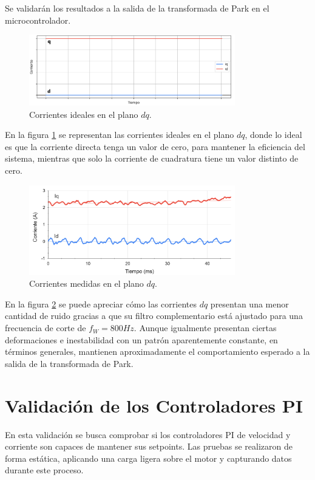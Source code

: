 \documentclass[11pt]{report}
\begin{document}
Se validarán los resultados a la salida de la transformada de Park en el microcontrolador.

\begin{figure}[ht]
	\centering
	\includegraphics[width=0.8\textwidth]{imagenes/graficas/Corrientes_dq_ideal.png}
	\caption{Corrientes ideales en el plano $dq$.}
	\label{corrientes_dq_ideal}
\end{figure}
\FloatBarrier

En la figura \ref{corrientes_dq_ideal} se representan las corrientes ideales en el plano $dq$, donde lo ideal es que la corriente directa tenga un valor de cero, para mantener la eficiencia del sistema, mientras que solo la corriente de cuadratura tiene un valor distinto de cero.

\begin{figure}[ht]
	\centering
	\includegraphics[width=0.8\textwidth]{imagenes/graficas/Corrientes_dq.png}
	\caption{Corrientes medidas en el plano $dq$.}
	\label{corrientes_dq}
\end{figure}
\FloatBarrier

En la figura \ref{corrientes_dq} se puede apreciar cómo las corrientes $dq$ presentan una menor cantidad de ruido gracias a que su filtro complementario está ajustado para una frecuencia de corte de $f_W=800Hz$. Aunque igualmente presentan ciertas deformaciones e inestabilidad con un patrón aparentemente constante, en términos generales, mantienen aproximadamente el comportamiento esperado a la salida de la transformada de Park.

\newpage
\section{Validación de los Controladores PI}
En esta validación se busca comprobar si los controladores PI de velocidad y corriente son capaces de mantener sus setpoints. Las pruebas se realizaron de forma estática, aplicando una carga ligera sobre el motor y capturando datos durante este proceso.
\end{document}
